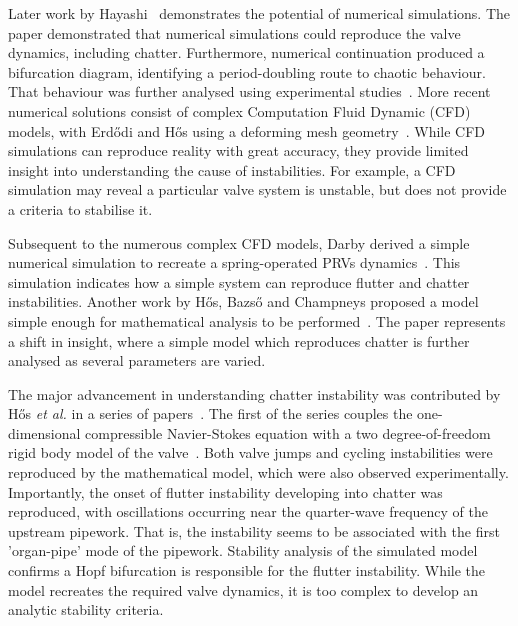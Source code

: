 Later work by Hayashi~\cite{Hayashi1995InstabilityCircuit} demonstrates the potential of numerical simulations. The paper demonstrated that numerical simulations could reproduce the valve dynamics, including chatter. Furthermore, numerical continuation produced a bifurcation diagram, identifying a period-doubling route to chaotic behaviour. That behaviour was further analysed using experimental studies~\cite{Bazso2013AnValve}. More recent numerical solutions consist of complex Computation Fluid Dynamic (CFD) models, with Erd\H{o}di and H\H{o}s using a deforming mesh geometry~\cite{Erdodi2017PredictionModelling}. While CFD simulations can reproduce reality with great accuracy, they provide limited insight into understanding the cause of instabilities. For example, a CFD simulation may reveal a particular valve system is unstable, but does not provide a criteria to stabilise it.

Subsequent to the numerous complex CFD models, Darby derived a simple numerical simulation to recreate a spring-operated PRVs dynamics~\cite{Darby2013TheModel}. This simulation indicates how a simple system can reproduce flutter and chatter instabilities. Another work by H\H{o}s, Bazs\H{o} and Champneys proposed a model simple enough for mathematical analysis to be performed~\cite{Hos2015ModelPipe}. The paper represents a shift in insight, where a simple model which reproduces chatter is further analysed as several parameters are varied.


The major advancement in understanding chatter instability was contributed by H\H{o}s \emph{et al.}
in a series of papers~\cite{Hos2014DynamicMechanisms,Hos2015DynamicModelling,Hos2016DynamicService,Hos2017DynamicRecommendations}. The first of the series couples the one-dimensional compressible Navier-Stokes equation with a two degree-of-freedom rigid body model of the valve~\cite{Hos2014DynamicMechanisms}.
Both valve jumps and cycling instabilities were reproduced by the mathematical model, which were also observed experimentally. Importantly, the onset of flutter instability developing into chatter was reproduced, with oscillations occurring near the quarter-wave frequency of the upstream pipework. That is, the instability seems to be associated with the first 'organ-pipe' mode of the pipework. Stability analysis of the simulated model confirms a Hopf bifurcation is responsible for the flutter instability. While the model recreates the required valve dynamics, it is too complex to develop an analytic stability criteria. %

